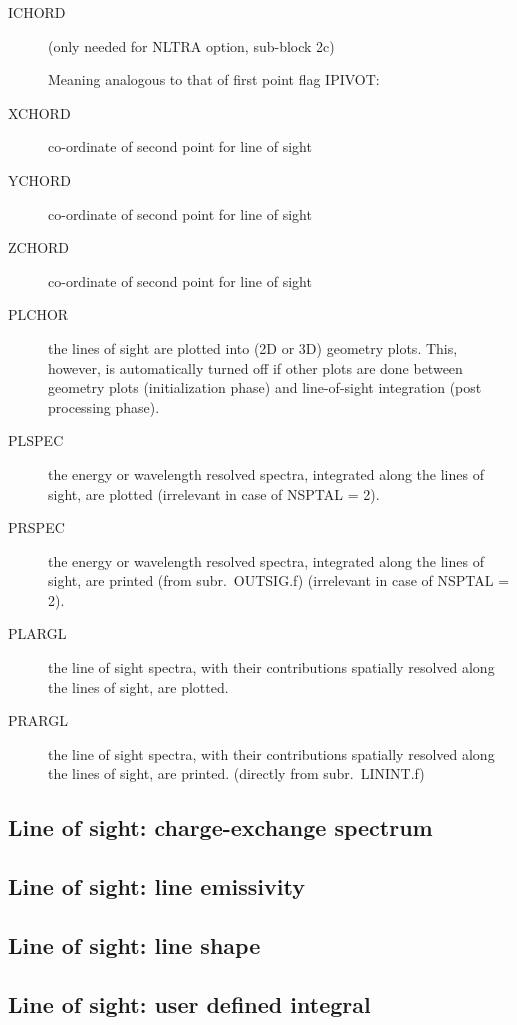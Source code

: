 \begin{description}
  \item[ICHORD] (only needed for NLTRA option, sub-block 2c)

        Meaning analogous to that of first point flag IPIVOT:

  \item[XCHORD]  co-ordinate of second point for line of sight
  \item[YCHORD]  co-ordinate of second point for line of sight
  \item[ZCHORD]  co-ordinate of second point for line of sight
  \item[PLCHOR] the lines of sight are plotted into (2D or 3D) geometry plots.
        This, however, is automatically turned off if other plots are done between
        geometry plots (initialization phase) and line-of-sight integration (post
        processing phase).
  \item[PLSPEC] the energy or wavelength resolved spectra, integrated along the
        lines of sight, are plotted (irrelevant in case of NSPTAL = 2).
  \item[PRSPEC] the energy or wavelength resolved spectra, integrated along the
        lines of sight, are printed (from subr.\ OUTSIG.f) (irrelevant in case of
        NSPTAL = 2).
  \item[PLARGL] the line of sight spectra, with their contributions spatially
        resolved along the lines of sight, are plotted.
  \item[PRARGL] the line of sight spectra, with their contributions spatially
        resolved along the lines of sight, are printed.
        (directly from subr.\ LININT.f)
\end{description}

\subsection{Line of sight: charge-exchange spectrum}
\label{sec2.12.1}

\subsection{Line of sight: line emissivity}\label{sec2.12.2}

\subsection{Line of sight: line shape}\label{sec2.12.3}

\subsection{Line of sight: user defined integral}\label{sec2.12.4}
